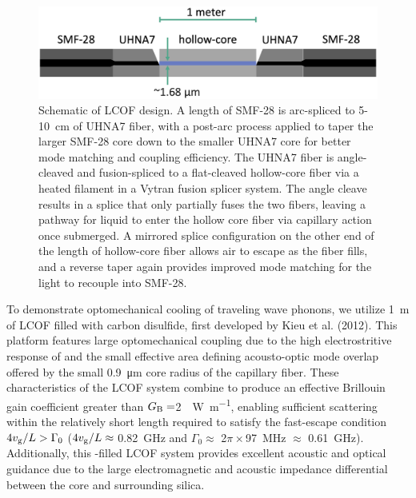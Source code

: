 \begin{figure}[t]
  \centering
  \includegraphics[width=\textwidth]{figs/2-Cooling/LCOFdiagram.png}
  \caption[Schematic of \ac{LCOF} design.]{Schematic of \ac{LCOF} design. A length of \ac{SMF-28} is arc-spliced to 5-\SI{10}{\centi\meter} of \ac{UHNA7} fiber, with a post-arc process applied to taper the larger \ac{SMF-28} core down to the smaller \ac{UHNA7} core for better mode matching and coupling efficiency. The \ac{UHNA7} fiber is angle-cleaved and fusion-spliced to a flat-cleaved hollow-core fiber via a heated filament in a Vytran fusion splicer system. The angle cleave results in a splice that only partially fuses the two fibers, leaving a pathway for liquid to enter the hollow core fiber via capillary action once submerged. A mirrored splice configuration on the other end of the length of hollow-core fiber allows air to escape as the fiber fills, and a reverse taper again provides improved mode matching for the light to recouple into \ac{SMF-28}.}
  \label{fig:LCOF diagram}
\end{figure}

To demonstrate optomechanical cooling of traveling wave phonons, we utilize \SI{1}{\meter} of \acl{LCOF} filled with carbon disulfide, first developed by Kieu et al. (2012). \cite{kieu2012integrated} This platform features large optomechanical coupling due to the high electrostritive response of  \cite{boyd2020nonlinear} and the small effective area defining acousto-optic mode overlap offered by the small \SI{0.9}{\micro\meter} core radius of the capillary fiber. These characteristics of the \ac{LCOF} system combine to produce an effective Brillouin gain coefficient greater than \(G_{\rm B} =\)\SI{2}{\per\watt\per\meter}, enabling sufficient scattering within the relatively short length required to satisfy the fast-escape condition \(4v_{\rm g}/L > \Gamma_{0}\) (\(4v_{\rm g}/L \approx\) \SI{0.82}{\giga\hertz} and \(\Gamma_{0} \approx\) 2\(\pi\times\)\SI{97}{\mega\hertz} \(\approx\) \SI{0.61}{\giga\hertz}). \cite{johnson2023laser} Additionally, this -filled \ac{LCOF} system provides excellent acoustic and optical guidance due to the large electromagnetic and acoustic impedance differential between the  core and surrounding silica. \cite{behunin2019spontaneous}

